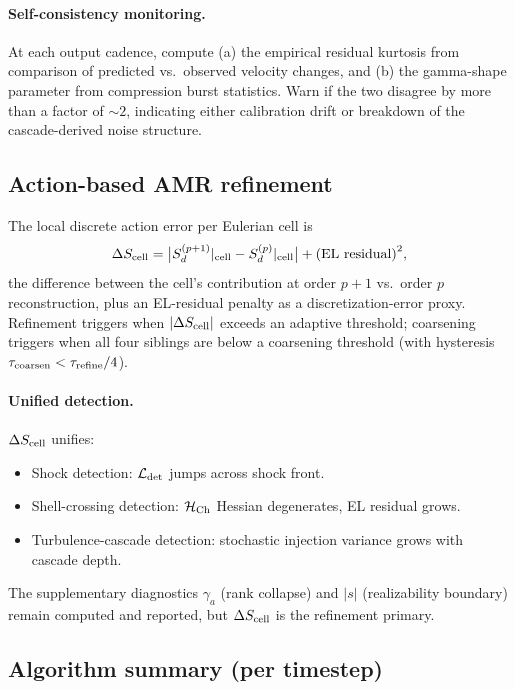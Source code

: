 \documentclass[11pt]{article}
\begin{document}
\paragraph{Self-consistency monitoring.} At each output cadence,
compute (a) the empirical residual kurtosis from comparison of
predicted vs.\ observed velocity changes, and (b) the gamma-shape
parameter from compression burst statistics. Warn if the two
disagree by more than a factor of $\sim 2$, indicating either
calibration drift or breakdown of the cascade-derived noise structure.

\subsection{Action-based AMR refinement}

The local discrete action error per Eulerian cell is
\begin{equation}
  \Delta S_{\rm cell} = \bigl|S_d^{(p+1)}|_{\rm cell} - S_d^{(p)}|_{\rm cell}\bigr| + \text{(EL residual)}^2,
  \label{eq:DS-cell}
\end{equation}
the difference between the cell's contribution at order $p+1$ vs.\
order $p$ reconstruction, plus an EL-residual penalty as a
discretization-error proxy. Refinement triggers when $|\Delta
S_{\rm cell}|$ exceeds an adaptive threshold; coarsening triggers
when all four siblings are below a coarsening threshold (with
hysteresis $\tau_{\rm coarsen}<\tau_{\rm refine}/4$).

\paragraph{Unified detection.} $\Delta S_{\rm cell}$ unifies:
\begin{itemize}
\item Shock detection: $\mathcal{L}_{\rm det}$ jumps across shock front.
\item Shell-crossing detection: $\mathcal{H}_{\rm Ch}$ Hessian
degenerates, EL residual grows.
\item Turbulence-cascade detection: stochastic injection variance
grows with cascade depth.
\end{itemize}
The supplementary diagnostics $\gamma_a$ (rank collapse) and $|s|$
(realizability boundary) remain computed and reported, but
$\Delta S_{\rm cell}$ is the refinement primary.

\subsection{Algorithm summary (per timestep)}
\end{document}
